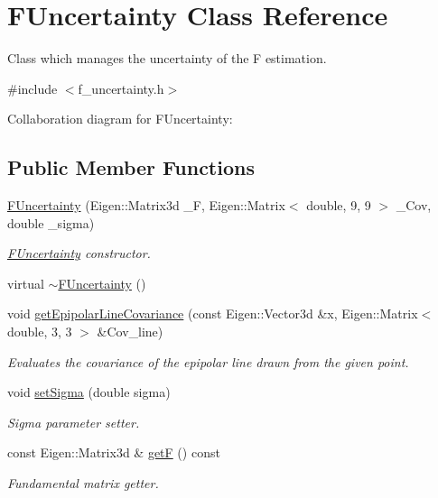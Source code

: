 \hypertarget{classFUncertainty}{}\section{F\+Uncertainty Class Reference}
\label{classFUncertainty}


Class which manages the uncertainty of the F estimation.  




{\ttfamily \#include $<$f\+\_\+uncertainty.\+h$>$}



Collaboration diagram for F\+Uncertainty\+:
\subsection*{Public Member Functions}
\begin{DoxyCompactItemize}
\item 
\hyperlink{classFUncertainty_aa4a2cfa475eb5e215324c92893acd61d}{F\+Uncertainty} (Eigen\+::\+Matrix3d \+\_\+\+F, Eigen\+::\+Matrix$<$ double, 9, 9 $>$ \+\_\+\+Cov, double \+\_\+sigma)
\begin{DoxyCompactList}\small\item\em \hyperlink{classFUncertainty}{F\+Uncertainty} constructor. \end{DoxyCompactList}\item 
virtual \hyperlink{classFUncertainty_a9c05e86636b662b06a65990c2925097d}{$\sim$\+F\+Uncertainty} ()
\item 
void \hyperlink{classFUncertainty_a6429cf931768edfe8bfae562ffd4f231}{get\+Epipolar\+Line\+Covariance} (const Eigen\+::\+Vector3d \&x, Eigen\+::\+Matrix$<$ double, 3, 3 $>$ \&Cov\+\_\+line)
\begin{DoxyCompactList}\small\item\em Evaluates the covariance of the epipolar line drawn from the given point. \end{DoxyCompactList}\item 
void \hyperlink{classFUncertainty_a3d64fda89d901f85ab0eac214c0b8f4e}{set\+Sigma} (double sigma)
\begin{DoxyCompactList}\small\item\em Sigma parameter setter. \end{DoxyCompactList}\item 
const Eigen\+::\+Matrix3d \& \hyperlink{classFUncertainty_ad769516a8a9c9e1eaa74d73d75c93cf2}{get\+F} () const 
\begin{DoxyCompactList}\small\item\em Fundamental matrix getter. \end{DoxyCompactList}\end{DoxyCompactItemize}


